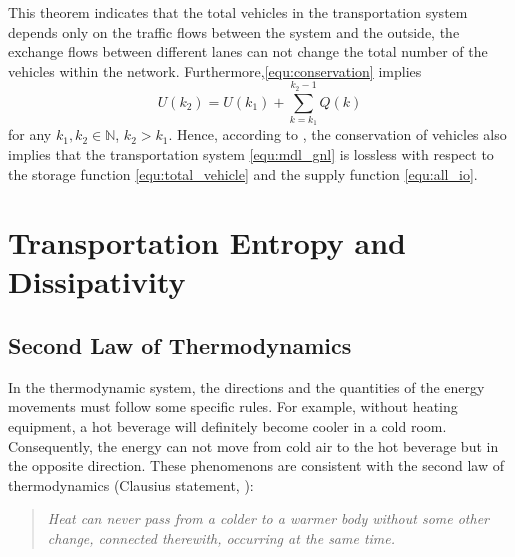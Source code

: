 \documentclass[preprint,authoryear,12pt]{elsarticle}
\begin{document}
This theorem indicates that the total vehicles in the transportation system depends only on the traffic flows between the system and the outside, the exchange flows between different lanes can not change the total number of the vehicles within the network. Furthermore,\eqref{equ:conservation} implies
\begin{equation}\label{equ:conservation_ex}
U(k_2) = U(k_1)+\sum_{k=k_1}^{k_2-1}Q(k)
\end{equation}
for any $k_1,k_2\in\mathbb{N}$, $k_2>k_1$. Hence, according to \citep{willems_dissipative_1972-1}, the conservation of vehicles also implies that the transportation system \eqref{equ:mdl_gnl} is lossless with respect to the storage function \eqref{equ:total_vehicle} and the supply function \eqref{equ:all_io}.

\section{Transportation Entropy and Dissipativity}\label{sec:entropy}

\subsection{Second Law of Thermodynamics}

In the thermodynamic system, the directions and the quantities of the energy movements must follow some specific rules. For example, without heating equipment, a hot beverage will definitely become cooler in a cold room. Consequently, the energy can not move from cold air to the hot beverage but in the opposite direction. These phenomenons are consistent with the second law of thermodynamics (Clausius statement, \citet{clausius_mechanical_1867}):
\begin{quotation}
\it Heat can never pass from a colder to a warmer body without some other change, connected therewith, occurring at the same time.
\end{quotation}
\end{document}

